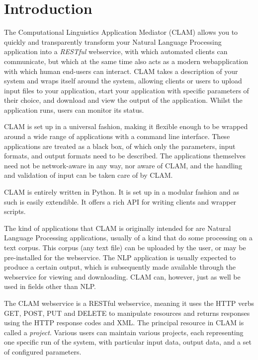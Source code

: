 \documentclass[a4paper,12pt]{report}
\begin{document}
\chapter{Introduction} 

The Computational Linguistics Application Mediator (CLAM) allows you to quickly
and transparently transform your Natural Language Processing application into a
\emph{RESTful}\/ webservice, with which automated clients can communicate, but
which at the same time also acts as a modern webapplication with which human
end-users can interact. CLAM takes a description of your system and wraps
itself around the system, allowing clients or users to upload input files to
your application, start your application with specific parameters of their
choice, and download and view the output of the application. Whilst the
application runs, users can monitor its status.

CLAM is set up in a universal fashion, making it flexible enough to be wrapped
around a wide range of applications with a command line interface. These
applications are treated as a black box, of which only the parameters, input
formats, and output formats need to be described. The applications themselves
need not be network-aware in any way, nor aware of CLAM, and the handling and
validation of input can be taken care of by CLAM.

CLAM is entirely written in Python. It is set up in a modular fashion and as
such is easily extendible. It offers a rich API for writing clients and wrapper
scripts.

The kind of applications that CLAM is originally intended for are Natural Language
Processing applications, usually of a kind that do some processing on a text
corpus. This corpus (any text file) can be uploaded by the user, or may be
pre-installed for the webservice. The NLP application is usually expected to
produce a certain output, which is subsequently made available through the
webservice for viewing and downloading. CLAM can, however, just as well be used
in fields other than NLP.

The CLAM webservice is a RESTful webservice\citep{REST}, meaning it uses the HTTP verbs
GET, POST, PUT and DELETE to manipulate resources and returns responses using
the HTTP response codes and XML. The principal resource in CLAM is called a
\emph{project}. Various users can maintain various projects, each representing
one specific run of the system, with particular input data, output data, and a
set of configured parameters.
\end{document}
